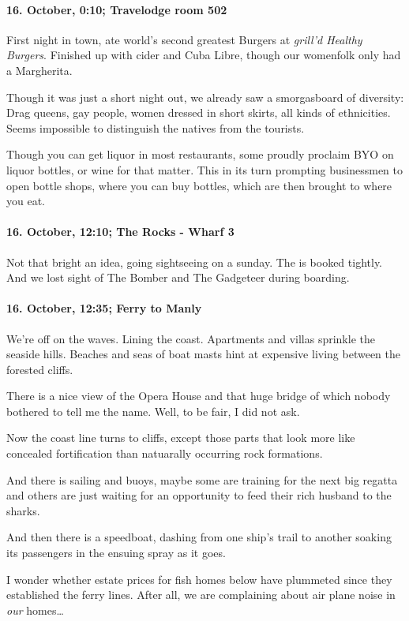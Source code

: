 \paragraph{16. October, 0:10; Travelodge room 502}
First night in town, ate world's second greatest Burgers at \emph{grill'd Healthy Burgers}.
Finished up with cider and Cuba Libre, though our womenfolk only had a Margherita.

Though it was just a short night out, we already saw a smorgasboard of diversity:
Drag queens, gay people, women dressed in short skirts, all kinds of ethnicities.
Seems impossible to distinguish the natives from the tourists.

Though you can get liquor in most restaurants, some proudly proclaim BYO on liquor bottles, or wine for that matter.
This in its turn prompting businessmen to open bottle shops, where you can buy bottles, which are then brought to where you eat.

\paragraph{16. October, 12:10; The Rocks - Wharf 3}
Not that bright an idea, going sightseeing on a sunday.
The is booked tightly.
And we lost sight of The Bomber and The Gadgeteer during boarding.

\paragraph{16. October, 12:35; Ferry to Manly}
We're off on the waves.
Lining the coast.
Apartments and villas sprinkle the seaside hills.
Beaches and seas of boat masts hint at expensive living between the forested cliffs.

There is a nice view of the Opera House and that huge bridge of which nobody bothered to tell me the name.
Well, to be fair, I did not ask.

Now the coast line turns to cliffs, except those parts that look more like concealed fortification than natuarally occurring rock formations.

And there is sailing and buoys, maybe some are training for the next big regatta and others are just waiting for an opportunity to feed their rich husband to the sharks.

And then there is a speedboat, dashing from one ship's trail to another soaking its passengers in the ensuing spray as it goes.

I wonder whether estate prices for fish homes below have plummeted since they established the ferry lines.
After all, we are complaining about air plane noise in \emph{our} homes\ldots{}


